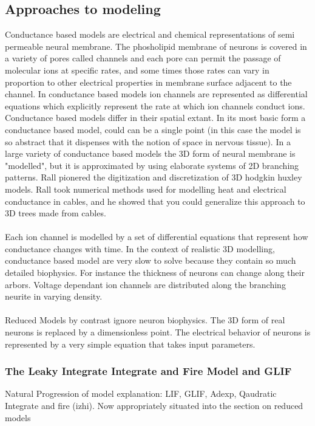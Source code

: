 \subsection{Approaches to modeling}
Conductance based models are electrical and chemical representations of semi permeable neural membrane.  The phosholipid membrane of neurons is covered in a variety of pores called channels and each pore can permit the passage of molecular ions at specific rates, and some times those rates can vary in proportion to other electrical properties in membrane surface adjacent to the channel. In conductance based models ion channels are represented as differential equations which explicitly represent the rate at which ion channels conduct ions. Conductance based models differ in their spatial extant. In its most basic form a conductance based model, could can be a single point (in this case the model is so abstract that it dispenses with the notion of space in nervous tissue). In a large variety of conductance based models the 3D form of neural membrane is "modelled", but it is approximated by using elaborate systems of 2D branching patterns. \cite{rall1962electrophysiology} Rall pionered the digitization and discretization of 3D hodgkin huxley models. Rall took numerical methods used for modelling heat and electrical conductance in cables, and he showed that you could generalize this approach to 3D trees made from cables.\\
\\
Each ion channel is modelled by a set of differential equations that represent how conductance changes with time. In the context of realistic 3D modelling, conductance based model are very slow to solve because they contain so much detailed biophysics. For instance the thickness of neurons can change along their arbors. Voltage dependant ion channels are distributed along the branching neurite in varying density.\\
\\
Reduced Models by contrast ignore neuron biophysics. The 3D form of real neurons is replaced by a dimensionless point. The electrical behavior of neurons is represented by a very simple equation that takes input parameters.

\subsubsection{The Leaky Integrate Integrate and Fire Model and GLIF}
Natural Progression of model explanation: LIF, GLIF, Adexp, Qaudratic Integrate and fire (izhi). Now appropriately situated into  the section on reduced models
